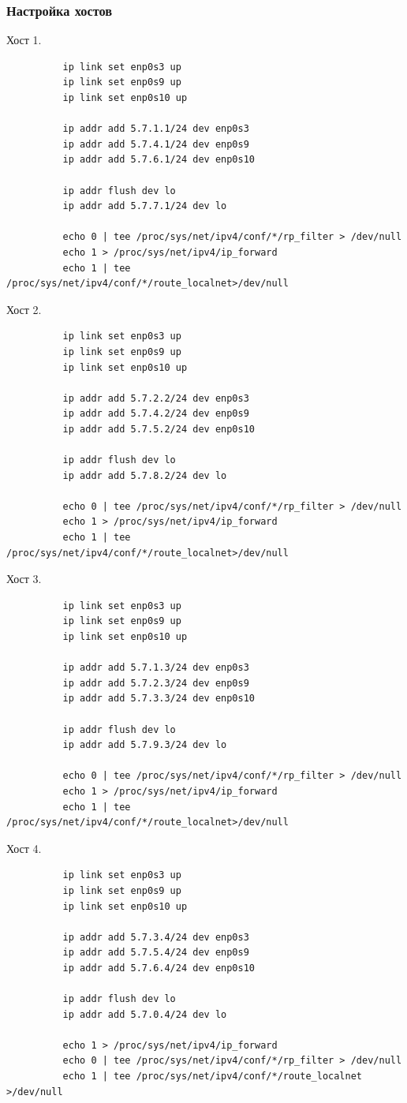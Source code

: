 \documentclass[11pt, a4paper] {ncc}
\begin{document}
        \subsubsection*{Настройка хостов}
		Хост 1.
        \begin{verbatim}
          ip link set enp0s3 up
          ip link set enp0s9 up
          ip link set enp0s10 up

          ip addr add 5.7.1.1/24 dev enp0s3
          ip addr add 5.7.4.1/24 dev enp0s9
          ip addr add 5.7.6.1/24 dev enp0s10

          ip addr flush dev lo
          ip addr add 5.7.7.1/24 dev lo
         
          echo 0 | tee /proc/sys/net/ipv4/conf/*/rp_filter > /dev/null
          echo 1 > /proc/sys/net/ipv4/ip_forward
          echo 1 | tee /proc/sys/net/ipv4/conf/*/route_localnet>/dev/null
        \end{verbatim}
		Хост 2.
        \begin{verbatim}
          ip link set enp0s3 up
          ip link set enp0s9 up
          ip link set enp0s10 up

          ip addr add 5.7.2.2/24 dev enp0s3
          ip addr add 5.7.4.2/24 dev enp0s9
          ip addr add 5.7.5.2/24 dev enp0s10

          ip addr flush dev lo
          ip addr add 5.7.8.2/24 dev lo

          echo 0 | tee /proc/sys/net/ipv4/conf/*/rp_filter > /dev/null
          echo 1 > /proc/sys/net/ipv4/ip_forward
          echo 1 | tee /proc/sys/net/ipv4/conf/*/route_localnet>/dev/null
        \end{verbatim}
		Хост 3.
        \begin{verbatim}
          ip link set enp0s3 up
          ip link set enp0s9 up
          ip link set enp0s10 up

          ip addr add 5.7.1.3/24 dev enp0s3
          ip addr add 5.7.2.3/24 dev enp0s9
          ip addr add 5.7.3.3/24 dev enp0s10

          ip addr flush dev lo
          ip addr add 5.7.9.3/24 dev lo

          echo 0 | tee /proc/sys/net/ipv4/conf/*/rp_filter > /dev/null
          echo 1 > /proc/sys/net/ipv4/ip_forward
          echo 1 | tee /proc/sys/net/ipv4/conf/*/route_localnet>/dev/null
        \end{verbatim}
		Хост 4.
        \begin{verbatim}
          ip link set enp0s3 up
          ip link set enp0s9 up
          ip link set enp0s10 up

          ip addr add 5.7.3.4/24 dev enp0s3
          ip addr add 5.7.5.4/24 dev enp0s9
          ip addr add 5.7.6.4/24 dev enp0s10

          ip addr flush dev lo
          ip addr add 5.7.0.4/24 dev lo

          echo 1 > /proc/sys/net/ipv4/ip_forward
          echo 0 | tee /proc/sys/net/ipv4/conf/*/rp_filter > /dev/null
          echo 1 | tee /proc/sys/net/ipv4/conf/*/route_localnet >/dev/null
        \end{verbatim}
\end{document}
